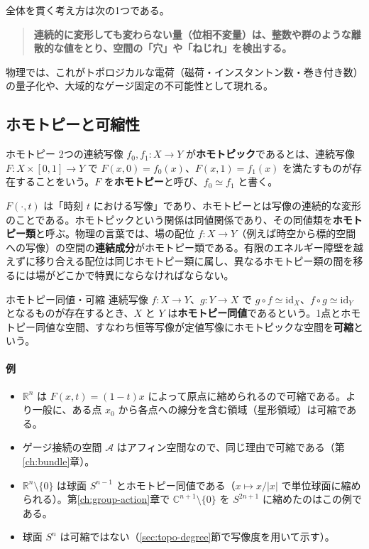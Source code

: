 \documentclass[uplatex, dvipdfmx, book]{jsbook}
\let\origsubsection\subsection
\let\origsubsubsection\subsubsection
\renewcommand{\section}{\origsubsection}
\renewcommand{\subsection}{\origsubsubsection}
\renewcommand{\subsubsection}{\paragraph}
\begin{document}
全体を貫く考え方は次の1つである。
\begin{quote}
\textbf{連続的に変形しても変わらない量（位相不変量）は、整数や群のような離散的な値をとり、空間の「穴」や「ねじれ」を検出する。}
\end{quote}
物理では、これがトポロジカルな電荷（磁荷・インスタントン数・巻き付き数）の量子化や、大域的なゲージ固定の不可能性として現れる。

\section{ホモトピーと可縮性}
\label{sec:topo-homotopy}

\begin{mydef}{ホモトピー}{}
2つの連続写像 $f_0, f_1: X \to Y$ が\textbf{ホモトピック}であるとは、連続写像 $F: X \times [0, 1] \to Y$ で $F(x, 0) = f_0(x)$、$F(x, 1) = f_1(x)$ を満たすものが存在することをいう。$F$ を\textbf{ホモトピー}と呼び、$f_0 \simeq f_1$ と書く。
\end{mydef}

$F(\cdot, t)$ は「時刻 $t$ における写像」であり、ホモトピーとは写像の連続的な変形のことである。ホモトピックという関係は同値関係であり、その同値類を\textbf{ホモトピー類}と呼ぶ。物理の言葉では、場の配位 $f: X \to Y$（例えば時空から標的空間への写像）の空間の\textbf{連結成分}がホモトピー類である。有限のエネルギー障壁を越えずに移り合える配位は同じホモトピー類に属し、異なるホモトピー類の間を移るには場がどこかで特異にならなければならない。

\begin{mydef}{ホモトピー同値・可縮}{}
連続写像 $f: X \to Y$、$g: Y \to X$ で $g \circ f \simeq \mathrm{id}_X$、$f \circ g \simeq \mathrm{id}_Y$ となるものが存在するとき、$X$ と $Y$ は\textbf{ホモトピー同値}であるという。1点とホモトピー同値な空間、すなわち恒等写像が定値写像にホモトピックな空間を\textbf{可縮}という。
\end{mydef}

\paragraph{例}
\begin{itemize}
    \item $\mathbb{R}^n$ は $F(x, t) = (1 - t)x$ によって原点に縮められるので可縮である。より一般に、ある点 $x_0$ から各点への線分を含む領域（星形領域）は可縮である。
    \item ゲージ接続の空間 $\mathcal{A}$ はアフィン空間なので、同じ理由で可縮である（第\ref{ch:bundle}章）。
    \item $\mathbb{R}^n \setminus \{0\}$ は球面 $S^{n-1}$ とホモトピー同値である（$x \mapsto x/|x|$ で単位球面に縮められる）。第\ref{ch:group-action}章で $\mathbb{C}^{n+1} \setminus \{0\}$ を $S^{2n+1}$ に縮めたのはこの例である。
    \item 球面 $S^n$ は可縮ではない（\ref{sec:topo-degree}節で写像度を用いて示す）。
\end{itemize}
\end{document}
